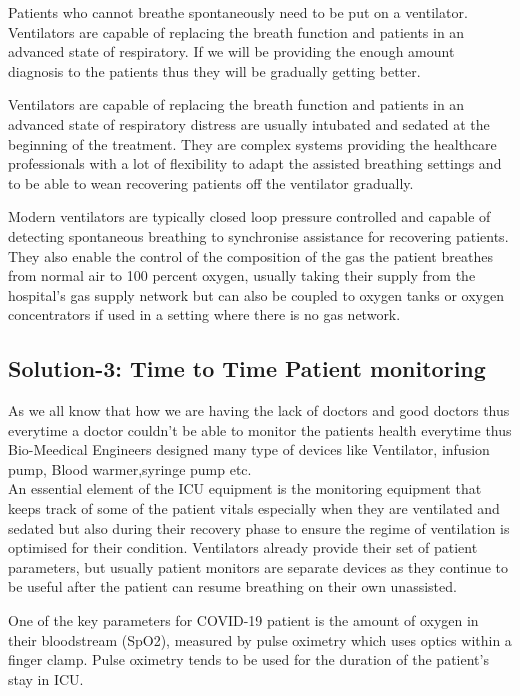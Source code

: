 \documentclass[12pts]{article}
\begin{document}
Patients who cannot breathe spontaneously need to be put on a ventilator. Ventilators are capable of replacing the breath function and patients in an advanced state of respiratory. If we will be providing the enough amount diagnosis to the patients thus they will be gradually getting better.

Ventilators are capable of replacing the breath function and patients in an advanced state of respiratory distress are usually intubated and sedated at the beginning of the treatment. They are complex systems providing the healthcare professionals with a lot of flexibility to adapt the assisted breathing settings and to be able to wean recovering patients off the ventilator gradually.

Modern ventilators are typically closed loop pressure controlled and capable of detecting spontaneous breathing to synchronise assistance for recovering patients. They also enable the control of the composition of the gas the patient breathes from normal air to 100 percent oxygen, usually taking their supply from the hospital’s gas supply network but can also be coupled to oxygen tanks or oxygen concentrators if used in a setting where there is no gas network.



\subsection*{Solution-3: Time to Time Patient monitoring}
As we all know that how we are having the lack of doctors and good doctors thus everytime a doctor couldn't be able to monitor the patients health everytime thus Bio-Meedical Engineers designed many type of devices like Ventilator, infusion pump, Blood warmer,syringe pump etc.\\
An essential element of the ICU equipment is the monitoring equipment that keeps track of some of the patient vitals especially when they are ventilated and sedated but also during their recovery phase to ensure the regime of ventilation is optimised for their condition. Ventilators already provide their set of patient parameters, but usually patient monitors are separate devices as they continue to be useful after the patient can resume breathing on their own unassisted.

One of the key parameters for COVID-19 patient is the amount of oxygen in their bloodstream (SpO2), measured by pulse oximetry which uses optics within a finger clamp. Pulse oximetry tends to be used for the duration of the patient’s stay in ICU.
\end{document}
